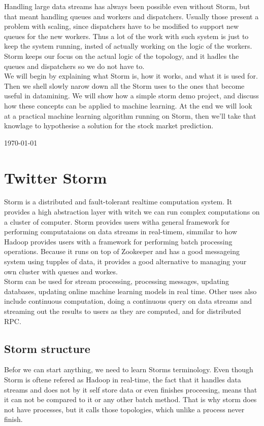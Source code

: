 \documentclass[journal]{IEEEtran/IEEEtran}
\begin{document}
Handling large data streams has always been possible even without Storm, but that meant handling queues and workers and dispatchers. Usually those present a problem with scaling, since dispatchers have to be modified to support new queues for the new workers. Thus a lot of the work with such system is just to keep the system running, insted of actually working on the logic of the workers. Storm keeps our focus on the actual logic of the topology, and it hadles the queues and dispatchers so we do not have to. \\

We will begin by explaining what Storm is, how it works, and what it is used for. Then we shell slowly narow down all the Storm uses to the ones that become useful in datamining. We will show how a simple storm demo project, and discuss how these concepts can be applied to machine learning. At the end we will look at a practical machine learning algorithm running on Storm, then we'll take that knowlage to hypothesise a solution for the stock market prediction.

\hfill \today
\section{Twitter Storm}
Storm is a distributed and fault-tolerant realtime computation system. It provides a high abstraction layer with witch we can run complex computations on a cluster of computer. Storm provides users witha general framework for performing computataions on data streams in real-timem, simmilar to how Hadoop provides users with a framework for performing batch processing operations. Because it runs on top of Zookeeper and has a good messageing system using tupples of data, it provides a good alternative to managing your own cluster with queues and workes. \\

Storm can be used for stream processing, processing messages, updating databases, updating online machine learning models in real time. Other uses also include continuous computation, doing a continuous query on data streams and streaming out the results to users as they are computed, and for distributed RPC.


\subsection{Storm structure}
Befor we can start anything, we need to learn Storms terminology. Even though Storm is oftene refered as Hadoop in real-time, the fact that it handles data streams and does not by it self store data or even finishes proceesing, means that it can not be compared to it or any other batch method. That is why storm does not have processes, but it calls those topologies, which unlike a process never finish.\\
\end{document}
